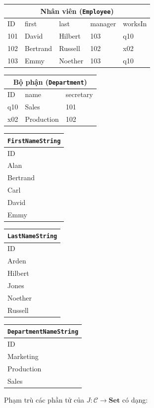 \begin{center}\small
\begin{tabular}{|l|l|l|l|l|}\hline\multicolumn{5}{|c|}{Nhân viên (\texttt{Employee})}\\\hline
ID&first&last&manager&worksIn\\\hline
101&David&Hilbert&103&q10\\\hline
102&Bertrand&Russell&102&x02\\\hline
103&Emmy&Noether&103&q10\\\hline
\end{tabular}\quad
\begin{tabular}{|l|l|l|}\hline\multicolumn{3}{|c|}{Bộ phận (\texttt{Department})}\\\hline
ID&name&secretary\\\hline q10&Sales&101\\\hline x02&Production&102\\\hline
\end{tabular}
\par\medskip
\begin{tabular}{|l|}\hline\texttt{FirstNameString}\\\hline ID\\\hline Alan\\\hline Bertrand\\\hline Carl\\\hline David\\\hline Emmy\\\hline\end{tabular}\quad
\begin{tabular}{|l|}\hline\texttt{LastNameString}\\\hline ID\\\hline Arden\\\hline Hilbert\\\hline Jones\\\hline Noether\\\hline Russell\\\hline\end{tabular}\quad
\begin{tabular}{|l|}\hline\texttt{DepartmentNameString}\\\hline ID\\\hline Marketing\\\hline Production\\\hline Sales\\\hline\end{tabular}
\end{center}
Phạm trù các phần tử của $J:\mathcal C\to\mathbf{Set}$ có dạng:
